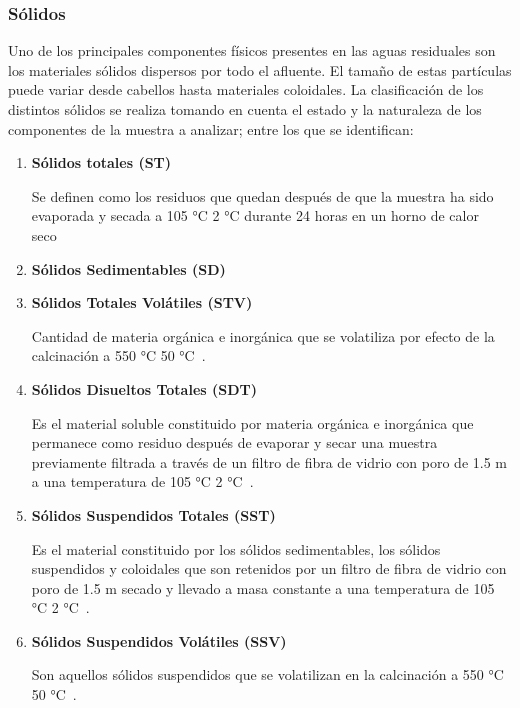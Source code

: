 \subsubsection*{Sólidos}
Uno de los principales componentes físicos presentes en las aguas residuales son los materiales sólidos dispersos por todo el afluente. El tamaño de estas partículas puede variar desde cabellos hasta materiales coloidales. La clasificación de los distintos sólidos se realiza tomando en cuenta el estado y la naturaleza de los componentes de la muestra a analizar; entre los que se identifican:
\begin{enumerate}
	\item \textbf{Sólidos totales (ST)}\par
	Se definen como los residuos que quedan después de que la muestra ha sido evaporada y secada a 105 °C  2 °C durante 24 horas en un horno de calor seco~\citep{Economia2015}
	\item \textbf{Sólidos Sedimentables (SD)} \par
	
	\item \textbf{Sólidos Totales Volátiles (STV)} \par
	Cantidad de materia orgánica e inorgánica que se volatiliza por efecto de la calcinación a 550 °C  50 °C~\citep{Economia2015}.
	\item \textbf{Sólidos Disueltos Totales (SDT)} \par
	Es el material soluble constituido por materia orgánica e inorgánica que permanece como residuo después de evaporar y secar una muestra previamente filtrada a través de un filtro de fibra de vidrio con poro de 1.5 m a una temperatura de 105 °C  2 °C~\citep{Economia2015}.
	\item \textbf{Sólidos Suspendidos Totales (SST)} \par
	Es el material constituido por los sólidos sedimentables, los sólidos  suspendidos y coloidales que son retenidos por un filtro de fibra de vidrio con poro de 1.5 m secado y llevado a masa constante a una temperatura de 105 °C  2 °C~\citep{Economia2015}.
	\item \textbf{Sólidos Suspendidos Volátiles (SSV)} \par                                                                  
	Son aquellos sólidos suspendidos que se volatilizan en la calcinación a 550 °C  50 °C~\citep{Economia2015}.
\end{enumerate}

